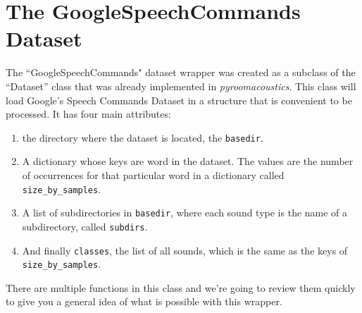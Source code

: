 \documentclass[11pt,a4paper,titlepage]{report}
\providecommand{\tightlist}{%
	\setlength{\itemsep}{0pt}\setlength{\parskip}{0pt}}
\begin{document}
\section{The GoogleSpeechCommands Dataset}
\hspace*{0.6cm}
The ``GoogleSpeechCommands" dataset wrapper was created as a subclass of the ``Dataset'' class that was already implemented in \textit{pyroomacoustics}. This class will load Google's Speech Commands Dataset in a structure that is convenient to be processed. It has four main attributes:
\begin{enumerate}
	\tightlist
	\item the directory where the dataset is located, the \texttt{basedir}.
	\item  A dictionary whose keys are word in the dataset. The values are the number of occurrences for that particular word in a dictionary called \texttt{size\_by\_samples}.
	\item  A list of subdirectories in \texttt{basedir}, where each sound type is the name of a subdirectory, called \texttt{subdirs}.
	\item  And finally \texttt{classes}, the list of all sounds, which is the same as the keys of \texttt{size\_by\_samples}.
\end{enumerate}
There are multiple functions in this class and we're going to review them quickly to give you a general idea of what is possible with this wrapper.
\end{document}
